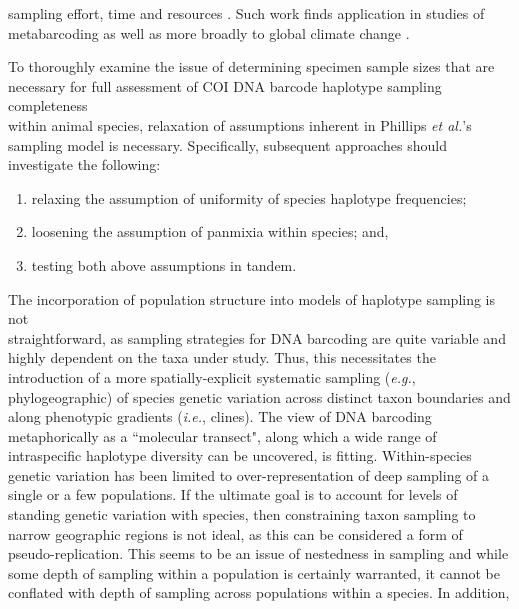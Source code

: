 sampling effort, time and resources \cite{hortal2005ed}. Such work finds application in studies of metabarcoding \cite{wares2015can} as well as more broadly to global climate change \cite{pfenninger2012methodological}.


To thoroughly examine the issue of determining specimen sample sizes that are \\ necessary for full assessment of COI DNA barcode haplotype sampling completeness \\ within animal species, relaxation of assumptions inherent in Phillips \textit{et al.}'s \cite{phillips2015exploration} sampling model is necessary. Specifically, subsequent approaches should investigate the following:

\begin{enumerate}

\item relaxing the assumption of uniformity of species haplotype frequencies;

\vspace{1mm}

\item loosening the assumption of panmixia within species; and,

\vspace{1mm}

\item testing both above assumptions in tandem.

\end{enumerate}

\noindent The incorporation of population structure into models of haplotype sampling is not \\ straightforward, as sampling strategies for DNA barcoding are quite variable and highly dependent on the taxa under study. Thus, this necessitates the introduction of a more spatially-explicit systematic sampling (\textit{e.g.}, phylogeographic) of species genetic variation across distinct taxon boundaries and along phenotypic gradients (\textit{i.e.}, clines). The view of DNA barcoding metaphorically as a ``molecular transect", along which a wide range of intraspecific haplotype diversity can be uncovered, is fitting. Within-species genetic variation has been limited to over-representation of deep sampling of a single or a few populations. If the ultimate goal is to account for levels of standing genetic variation with species, then constraining taxon sampling to narrow geographic regions is not ideal, as this can be considered a form of pseudo-replication. This seems to be an issue of nestedness in sampling and while some depth of sampling within a population is certainly warranted, it cannot be conflated with depth of sampling across populations within a species. In addition,



